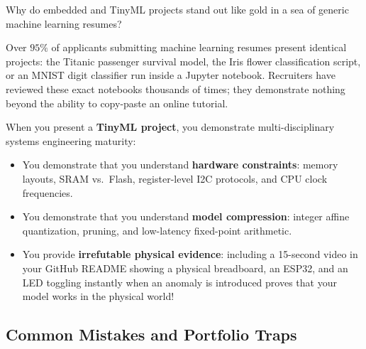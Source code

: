 \begin{iotbox}
Why do embedded and TinyML projects stand out like gold in a sea of generic machine learning resumes?

Over $95\%$ of applicants submitting machine learning resumes present identical projects: the Titanic passenger survival model, the Iris flower classification script, or an MNIST digit classifier run inside a Jupyter notebook. Recruiters have reviewed these exact notebooks thousands of times; they demonstrate nothing beyond the ability to copy-paste an online tutorial.

When you present a \textbf{TinyML project}, you demonstrate multi-disciplinary systems engineering maturity:
\begin{itemize}
    \item You demonstrate that you understand \textbf{hardware constraints}: memory layouts, SRAM vs.\ Flash, register-level I2C protocols, and CPU clock frequencies.
    \item You demonstrate that you understand \textbf{model compression}: integer affine quantization, pruning, and low-latency fixed-point arithmetic.
    \item You provide \textbf{irrefutable physical evidence}: including a 15-second video in your GitHub README showing a physical breadboard, an ESP32, and an LED toggling instantly when an anomaly is introduced proves that your model works in the physical world!
\end{itemize}
\end{iotbox}

\subsection{Common Mistakes and Portfolio Traps}\label{subsec:p4_pitfalls}

